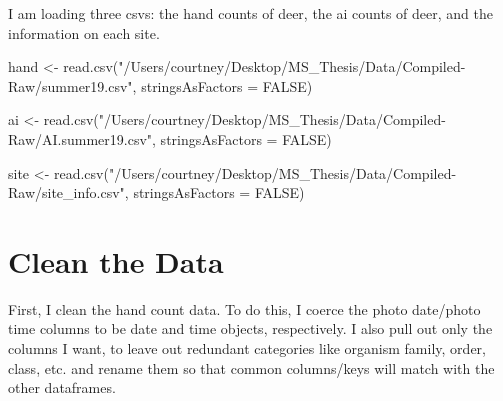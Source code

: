 \documentclass[
]{book}
\newenvironment{Shaded}{\begin{snugshade}}{\end{snugshade}}
\newcommand{\AttributeTok}[1]{\textcolor[rgb]{0.77,0.63,0.00}{#1}}
\newcommand{\ConstantTok}[1]{\textcolor[rgb]{0.00,0.00,0.00}{#1}}
\newcommand{\FunctionTok}[1]{\textcolor[rgb]{0.00,0.00,0.00}{#1}}
\newcommand{\NormalTok}[1]{#1}
\newcommand{\OtherTok}[1]{\textcolor[rgb]{0.56,0.35,0.01}{#1}}
\newcommand{\StringTok}[1]{\textcolor[rgb]{0.31,0.60,0.02}{#1}}
\begin{document}
I am loading three csvs: the hand counts of deer, the ai counts of deer, and the information on each site.

\begin{Shaded}
\begin{Highlighting}[]
\NormalTok{hand }\OtherTok{\textless{}{-}} \FunctionTok{read.csv}\NormalTok{(}\StringTok{"/Users/courtney/Desktop/MS\_Thesis/Data/Compiled{-}Raw/summer19.csv"}\NormalTok{, }\AttributeTok{stringsAsFactors =} \ConstantTok{FALSE}\NormalTok{)}

\NormalTok{ai }\OtherTok{\textless{}{-}} \FunctionTok{read.csv}\NormalTok{(}\StringTok{"/Users/courtney/Desktop/MS\_Thesis/Data/Compiled{-}Raw/AI.summer19.csv"}\NormalTok{, }\AttributeTok{stringsAsFactors =} \ConstantTok{FALSE}\NormalTok{)}

\NormalTok{site }\OtherTok{\textless{}{-}} \FunctionTok{read.csv}\NormalTok{(}\StringTok{"/Users/courtney/Desktop/MS\_Thesis/Data/Compiled{-}Raw/site\_info.csv"}\NormalTok{, }\AttributeTok{stringsAsFactors =} \ConstantTok{FALSE}\NormalTok{)}
\end{Highlighting}
\end{Shaded}

\hypertarget{clean-the-data}{%
\section{Clean the Data}\label{clean-the-data}}

First, I clean the hand count data. To do this, I coerce the photo date/photo time columns to be date and time objects, respectively. I also pull out only the columns I want, to leave out redundant categories like organism family, order, class, etc. and rename them so that common columns/keys will match with the other dataframes.
\end{document}
